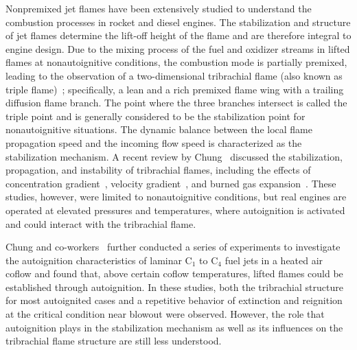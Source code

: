 \documentclass[review,3p,times]{elsarticle}
\begin{document}
Nonpremixed jet flames have been extensively studied to understand the combustion processes in rocket and diesel engines.  The stabilization and structure of jet flames determine the lift-off height of the flame and are therefore integral to engine design.  Due to the mixing process of the fuel and oxidizer streams in lifted flames at nonautoignitive conditions, the combustion mode is partially premixed, leading to the observation of a two-dimensional tribrachial flame (also known as triple flame)~\cite{buckmaster02}; specifically, a lean and a rich premixed flame wing with a trailing diffusion flame branch.  The point where the three branches intersect is called the triple point and is generally considered to be the stabilization point for nonautoignitive situations. The dynamic balance between the local flame propagation speed and the incoming flow speed is characterized as the stabilization mechanism.  A recent review by Chung~\cite{chung07} discussed the stabilization, propagation, and instability of tribrachial flames, including the effects of concentration gradient~\cite{dold89,hartley91,ghosal00}, velocity gradient~\cite{kim07}, and burned gas expansion~\cite{ruetsch95,lee97,plessing98,kioni99}.  These studies, however, were limited to nonautoignitive conditions, but real engines are operated at elevated pressures and temperatures, where autoignition is activated and could interact with the tribrachial flame. 

Chung and co-workers~\cite{choi09,choi10,choi12} further conducted a series of experiments to investigate the autoignition characteristics of laminar C$_1$ to C$_4$ fuel jets in a heated air coflow and found that, above certain coflow temperatures, lifted flames could be established through autoignition.  In these studies, both the tribrachial structure for most autoignited cases and a repetitive behavior of extinction and reignition at the critical condition near blowout were observed.  However, the role that autoignition plays in the stabilization mechanism as well as its influences on the tribrachial flame structure are still less understood.  
\end{document}

